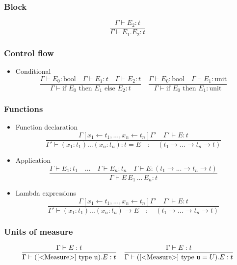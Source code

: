 \documentclass[]{article}
\begin{document}
		\subsubsection{Block}
		\[
		\frac{\Gamma \vdash E_2: t}{\Gamma \vdash E_1.E_2: t}
		\]
		
		\subsubsection{Control flow}
		\begin{itemize}
			\item Conditional
			\[
			\frac{\Gamma \vdash E_0: \text{bool} \quad \Gamma \vdash E_1: t \quad 	\Gamma \vdash E_2: t}{\Gamma \vdash \text{if } E_0 \text{ then } E_1 \text{ else } E_2:t} \quad
			\frac{\Gamma \vdash E_0: \text{bool} \quad \Gamma \vdash E_1: 	\text{unit}}{\Gamma \vdash \text{if } E_0 \text{ then } E_1 : \text{unit}}
			\]
		\end{itemize}
		
		\subsubsection{Functions}
		\begin{itemize}
			\item Function declaration
			\[
			\frac{\Gamma[x_1 \leftarrow t_1, ..., x_n \leftarrow t_n]\Gamma' \quad 	\Gamma' \vdash E: t}{\Gamma' \vdash (x_1: t_1)...(x_n: t_n): t = E \quad:\quad (t_1 \rightarrow ... \rightarrow t_n \rightarrow t)}
			\]
			\item Application
			\[
			\frac{\Gamma \vdash E_1: t_1 \quad ... \quad \Gamma \vdash E_n: t_n \quad 	\Gamma \vdash E: (t_1 \rightarrow ... \rightarrow t_n \rightarrow t)}{\Gamma \vdash E \, E_1 \, ... \, E_n:t}
			\]
			\item Lambda expressions
			\[
			\frac{\Gamma[x_1 \leftarrow t_1, ..., x_n \leftarrow t_n]\Gamma' \quad 	\Gamma' \vdash E: t}{\Gamma' \vdash (x_1: t_1)...(x_n: t_n) \rightarrow E \quad:\quad (t_1 \rightarrow ... \rightarrow t_n \rightarrow t)}
			\]
		\end{itemize}
		\subsubsection{Units of measure}
		\[
		\frac{\Gamma \vdash E: t}{\Gamma \vdash (\text{$[$\textless Measure\textgreater$]$ type u}).E: t} \quad
		\frac{\Gamma \vdash E: t}{\Gamma \vdash (\text{$[$\textless Measure\textgreater$]$ type u} = U).E: t}
		\]
		
\end{document}
